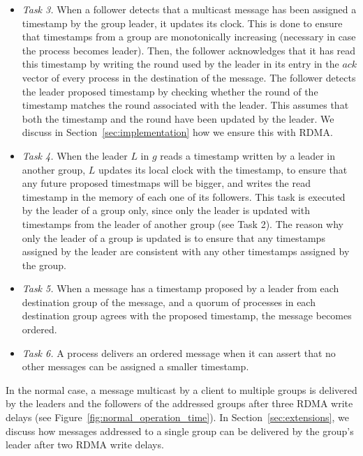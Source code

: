 \begin{itemize}
\item \emph{Task 3.} When a follower detects that a multicast message has been assigned a timestamp by the group leader, it updates its clock.
This is done to ensure that timestamps from a group are monotonically increasing (necessary in case the process becomes leader).
Then, the follower acknowledges that it has read this timestamp by writing the round used by the leader in its entry in the $ack$ vector of every process in the destination of the message.
The follower detects the leader proposed timestamp by checking whether the round of the timestamp matches the round associated with the  leader. 
This assumes that both the timestamp and the round have been updated by the leader.
We discuss in Section~\ref{sec:implementation} how we ensure this with RDMA.

\item \emph{Task 4.} 
When the leader $L$ in $g$ reads a timestamp written by a leader in another group, $L$ updates its local clock with the timestamp, to ensure that any future proposed timestmaps will be bigger, and writes the read timestamp in the memory of each one of its followers.
This task is executed by the leader of a group only, since only the leader is updated with timestamps from the leader of another group (see Task 2).
The reason why only the leader of a group is updated is to ensure that any timestamps assigned by the leader are consistent with any other timestamps assigned by the group.

\item \emph{Task 5.} 
When a message has a timestamp proposed by a leader from each destination group of the message, and a quorum of processes in each destination group agrees with the proposed timestamp, the message becomes ordered.

\item \emph{Task 6.} 
A process delivers an ordered message when it can assert that no other messages can be assigned a smaller timestamp.

\end{itemize}

In the normal case, a message multicast by a client to multiple groups is delivered by the leaders and the followers of the addressed groups after three RDMA write delays (see Figure~\ref{fig:normal_operation_time}).
In Section~\ref{sec:extensions}, we discuss how messages addressed to a single group can be delivered by the group's leader after two RDMA write delays.


